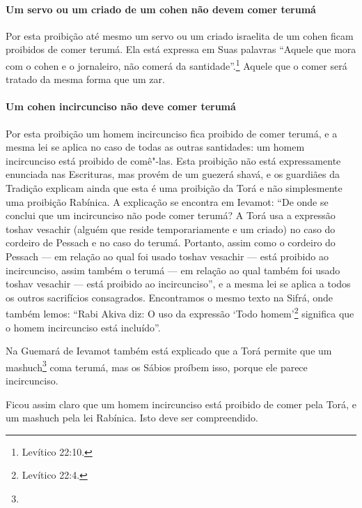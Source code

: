 \begin{multicols}{2}
\paragraph{Um servo ou um criado de um cohen\starr{} não devem comer terumá\starr}

Por esta proibição até mesmo um servo ou um criado israelita de um
cohen\starr{} ficam proibidos de comer terumá\starr. Ela está expressa em Suas
palavras ``Aquele que mora com o cohen\starr{} e o jornaleiro, não comerá da
santidade''.\footnote{Levítico 22:10.} Aquele que o comer será tratado da mesma
forma que um zar\starr.

\paragraph{Um cohen\starr{} incircunciso não deve comer terumá\starr}

Por esta proibição um homem incircunciso fica proibido de comer
terumá\starr, e a mesma lei se aplica no caso de todas as outras santidades:
um homem incircunciso está proibido de comê"-las. Esta proibição não está
expressamente enunciada nas Escrituras, mas provém de um guezerá
shavá\starr, e os guardiães da Tradição explicam ainda
que esta é uma proibição da Torá\starr{} e não simplesmente uma proibição
Rabínica. A explicação se encontra em Ievamot\starr: ``De onde se conclui que
um incircunciso não pode comer terumá\starr? A Torá\starr{} usa a expressão toshav vesachir\starr{} (alguém que reside temporariamente e um criado) no caso do
cordeiro de Pessach\starr{} e no caso do terumá\starr. Portanto, assim como o
cordeiro do Pessach\starr{} --- em relação ao qual foi usado toshav vesachir\starr{}
--- está proibido ao incircunciso, assim também o terumá\starr{} --- em
relação ao qual também foi usado toshav vesachir\starr{} --- está proibido ao
incircunciso'', e a mesma lei se aplica a todos os outros sacrifícios
consagrados. Encontramos o mesmo texto na Sifrá\starr, onde também lemos:
``Rabi Akiva\starr{} diz: O uso da expressão `Todo homem'\footnote{Levítico 22:4.}
significa que o homem incircunciso está incluído''.

Na Guemará\starr{} de Ievamot\starr{} também está explicado que a Torá\starr{} permite que um
mashuch\footnote{} coma terumá\starr, mas os Sábios proíbem
isso, porque ele parece incircunciso.

Ficou assim claro que um homem incircunciso está proibido de comer pela
Torá\starr, e um mashuch\starr{} pela lei Rabínica. Isto deve ser compreendido.


\end{multicols}
